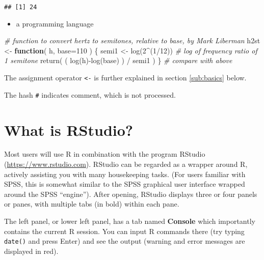 \documentclass[
]{book}
\newenvironment{Shaded}{\begin{snugshade}}{\end{snugshade}}
\newcommand{\AttributeTok}[1]{\textcolor[rgb]{0.77,0.63,0.00}{#1}}
\newcommand{\CommentTok}[1]{\textcolor[rgb]{0.56,0.35,0.01}{\textit{#1}}}
\newcommand{\ControlFlowTok}[1]{\textcolor[rgb]{0.13,0.29,0.53}{\textbf{#1}}}
\newcommand{\DecValTok}[1]{\textcolor[rgb]{0.00,0.00,0.81}{#1}}
\newcommand{\FunctionTok}[1]{\textcolor[rgb]{0.00,0.00,0.00}{#1}}
\newcommand{\NormalTok}[1]{#1}
\newcommand{\OtherTok}[1]{\textcolor[rgb]{0.56,0.35,0.01}{#1}}
\newcommand{\SpecialCharTok}[1]{\textcolor[rgb]{0.00,0.00,0.00}{#1}}
\providecommand{\tightlist}{%
  \setlength{\itemsep}{0pt}\setlength{\parskip}{0pt}}
\begin{document}
\begin{verbatim}
## [1] 24
\end{verbatim}

\begin{itemize}
\tightlist
\item
  a programming language
\end{itemize}

\begin{Shaded}
\begin{Highlighting}[]
\CommentTok{\# function to convert hertz to semitones, relative to \textasciigrave{}base\textasciigrave{}, by Mark Liberman}
\NormalTok{h2st }\OtherTok{\textless{}{-}} \ControlFlowTok{function}\NormalTok{( h, }\AttributeTok{base=}\DecValTok{110}\NormalTok{ ) \{ }
\NormalTok{  semi1 }\OtherTok{\textless{}{-}} \FunctionTok{log}\NormalTok{(}\DecValTok{2}\SpecialCharTok{\^{}}\NormalTok{(}\DecValTok{1}\SpecialCharTok{/}\DecValTok{12}\NormalTok{)) }\CommentTok{\# log of frequency ratio of 1 semitone}
  \FunctionTok{return}\NormalTok{( ( }\FunctionTok{log}\NormalTok{(h)}\SpecialCharTok{{-}}\FunctionTok{log}\NormalTok{(base) ) }\SpecialCharTok{/}\NormalTok{ semi1 ) \} }\CommentTok{\# compare with above}
\end{Highlighting}
\end{Shaded}

The assignment operator \texttt{\textless{}-}
is further explained in section \ref{sub:basics} below.

The hash \texttt{\#} indicates comment, which is not processed.

\hypertarget{sec:whatisrstudio}{%
\section{What is RStudio?}\label{sec:whatisrstudio}}

Most users will use R in combination with the program RStudio (\url{https://www.rstudio.com}). RStudio can be regarded as a wrapper around R, actively assisting you with many housekeeping tasks. (For users familiar with SPSS, this is somewhat similar to the SPSS graphical user interface wrapped around the SPSS ``engine''). After opening, RStudio displays three or four panels or panes, with multiple tabs (in bold) within each pane.

The left panel, or lower left panel, has a tab named \textbf{Console} which importantly contains the current R session. You can input R commands there (try typing \texttt{date()} and press Enter) and see the output (warning and error messages are displayed in red).
\end{document}
